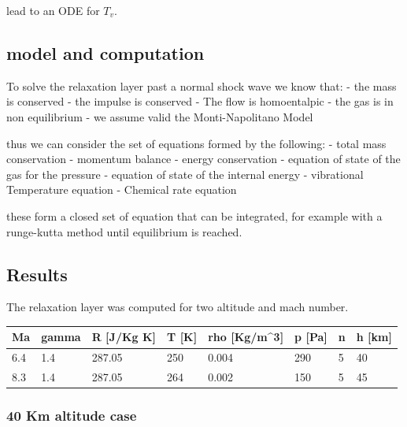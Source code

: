 \documentclass[
]{article}
\begin{document}
lead to an ODE for \(T_v\).

\hypertarget{model-and-computation}{%
\subsection{model and computation}\label{model-and-computation}}

To solve the relaxation layer past a normal shock wave we know that: -
the mass is conserved - the impulse is conserved - The flow is
homoentalpic - the gas is in non equilibrium - we assume valid the
Monti-Napolitano Model

thus we can consider the set of equations formed by the following: -
total mass conservation - momentum balance - energy conservation -
equation of state of the gas for the pressure - equation of state of the
internal energy - vibrational Temperature equation - Chemical rate
equation

these form a closed set of equation that can be integrated, for example
with a runge-kutta method until equilibrium is reached.

\hypertarget{results}{%
\subsection{Results}\label{results}}

The relaxation layer was computed for two altitude and mach number.

\begin{longtable}[]{@{}llllllll@{}}
\toprule
Ma & gamma & R {[}J/Kg K{]} & T {[}K{]} & rho {[}Kg/m\^{}3{]} & p
{[}Pa{]} & n & h {[}km{]} \\
\midrule
\endhead
6.4 & 1.4 & 287.05 & 250 & 0.004 & 290 & 5 & 40 \\
8.3 & 1.4 & 287.05 & 264 & 0.002 & 150 & 5 & 45 \\
\bottomrule
\end{longtable}

\hypertarget{km-altitude-case}{%
\subsubsection{40 Km altitude case}\label{km-altitude-case}}
\end{document}
